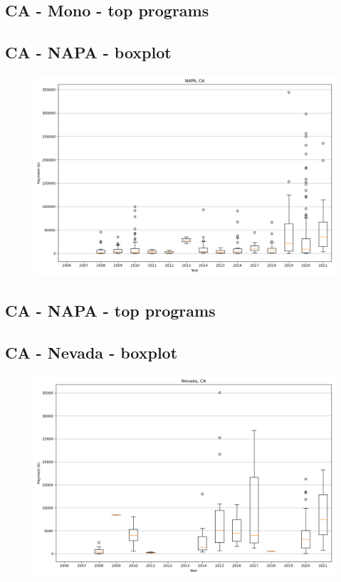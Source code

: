 \subsection*{CA - Mono - top programs}

\newpage
\subsection*{CA - NAPA - boxplot}
\begin{figure}[h]
\centering
\includegraphics[width=7in]{../output/boxplots/counties/NAPA-CA_boxplot.png}
\end{figure}


\subsection*{CA - NAPA - top programs}

\newpage
\subsection*{CA - Nevada - boxplot}
\begin{figure}[h]
\centering
\includegraphics[width=7in]{../output/boxplots/counties/Nevada-CA_boxplot.png}
\end{figure}


